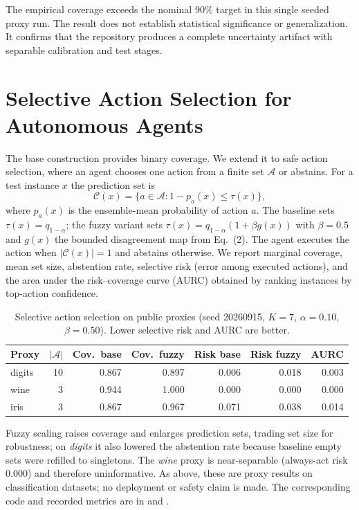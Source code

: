 \documentclass[sigconf]{acmart}
\begin{document}
The empirical coverage exceeds the nominal 90\% target in this single seeded proxy run. The result does not establish statistical significance or generalization. It confirms that the repository produces a complete uncertainty artifact with separable calibration and test stages.

\section{Selective Action Selection for Autonomous Agents}
\label{sec:selective}
The base construction provides binary coverage. We extend it to safe action
selection, where an agent chooses one action from a finite set $\mathcal{A}$ or
abstains. For a test instance $x$ the prediction set is
\begin{equation}
\mathcal{C}(x)=\{a\in\mathcal{A}: 1-p_a(x)\le \tau(x)\},
\end{equation}
where $p_a(x)$ is the ensemble-mean probability of action $a$. The baseline sets
$\tau(x)=q_{1-\alpha}$; the fuzzy variant sets
$\tau(x)=q_{1-\alpha}(1+\beta g(x))$ with $\beta=0.5$ and $g(x)$ the bounded
disagreement map from Eq.~(2). The agent executes the action when
$|\mathcal{C}(x)|=1$ and abstains otherwise. We report marginal coverage, mean set
size, abstention rate, selective risk (error among executed actions), and the
area under the risk--coverage curve (AURC) obtained by ranking instances by
top-action confidence.

\begin{table}[t]
\centering
\small
\caption{Selective action selection on public proxies (seed 20260915, $K=7$, $\alpha=0.10$, $\beta=0.50$). Lower selective risk and AURC are better.}
\begin{tabular}{lrrrrrr}
\toprule
Proxy & $|\mathcal{A}|$ & Cov.\ base & Cov.\ fuzzy & Risk base & Risk fuzzy & AURC \\
\midrule
digits & 10 & 0.867 & 0.897 & 0.006 & 0.018 & 0.003 \\
wine   & 3  & 0.944 & 1.000 & 0.000 & 0.000 & 0.000 \\
iris   & 3  & 0.867 & 0.967 & 0.071 & 0.038 & 0.014 \\
\bottomrule
\end{tabular}
\end{table}

Fuzzy scaling raises coverage and enlarges prediction sets, trading set size for
robustness; on \textit{digits} it also lowered the abstention rate because baseline
empty sets were refilled to singletons. The \textit{wine} proxy is near-separable
(always-act risk $0.000$) and therefore uninformative. As above, these are proxy
results on classification datasets; no deployment or safety claim is made. The
corresponding code and recorded metrics are in 
and .
\end{document}
